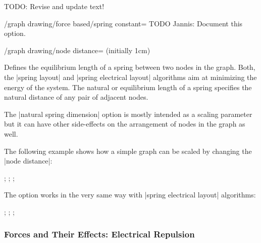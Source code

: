 TODO: Revise and update text! 

\begin{key}{/graph drawing/force based/spring constant=}
  TODO Jannis: Document this option.
\end{key}


\begin{key}{/graph drawing/node distance= (initially 1cm)}

  Defines the equilibrium length of a spring between two nodes in the
  graph. Both, the |spring layout| and |spring electrical layout|
  algorithms aim at minimizing the energy of the system. The
  natural or equilibrium length of a spring specifies the natural
  distance of any pair of adjacent nodes.

  The |natural spring dimension| option is mostly intended as a scaling
  parameter but it can have other side-effects on the arrangement of
  nodes in the graph as well.

  The following example shows how a simple graph can be scaled by
  changing the |node distance|:
\begin{codeexample}[]
\tikz {};
\tikz {};
\tikz {};
\end{codeexample}

  The option works in the very same way with |spring electrical layout|
  algorithms:
\begin{codeexample}[]
\tikz {};
\tikz {};
\tikz {};
\end{codeexample}
\end{key}



\subsubsection{Forces and Their Effects: Electrical Repulsion}



